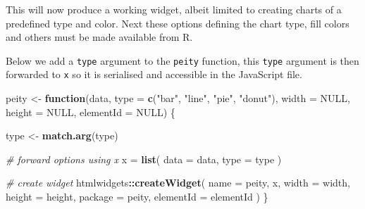 \documentclass[
]{krantz}
\makeatletter
\newenvironment{Shaded}{\begin{snugshade}}{\end{snugshade}}
\newcommand{\CommentTok}[1]{\textcolor[rgb]{0.37,0.37,0.37}{\textit{#1}}}
\newcommand{\ControlFlowTok}[1]{\textcolor[rgb]{0.27,0.27,0.27}{\textbf{#1}}}
\newcommand{\DataTypeTok}[1]{\textcolor[rgb]{0.27,0.27,0.27}{#1}}
\newcommand{\FunctionTok}[1]{\textcolor[rgb]{0,0,0}{#1}}
\newcommand{\KeywordTok}[1]{\textcolor[rgb]{0.27,0.27,0.27}{\textbf{#1}}}
\newcommand{\NormalTok}[1]{#1}
\newcommand{\OperatorTok}[1]{\textcolor[rgb]{0.43,0.43,0.43}{\textbf{#1}}}
\newcommand{\OtherTok}[1]{\textcolor[rgb]{0.37,0.37,0.37}{#1}}
\newcommand{\StringTok}[1]{\textcolor[rgb]{0.5,0.5,0.5}{#1}}
\newenvironment{kframe}{%
\medskip{}
\setlength{\fboxsep}{.8em}
 \def\at@end@of@kframe{}%
 \ifinner\ifhmode%
  \def\at@end@of@kframe{\end{minipage}}%
  \begin{minipage}{\columnwidth}%
 \fi\fi%
 \def\FrameCommand##1{\hskip\@totalleftmargin \hskip-\fboxsep
 \colorbox{shadecolor}{##1}\hskip-\fboxsep
     \hskip-\linewidth \hskip-\@totalleftmargin \hskip\columnwidth}%
 \MakeFramed {\advance\hsize-\width
   \@totalleftmargin\z@ \linewidth\hsize
   \@setminipage}}%
 {\par\unskip\endMakeFramed%
 \at@end@of@kframe}
\renewenvironment{Shaded}{\begin{kframe}}{\end{kframe}}
\makeatother
\begin{document}
\begin{Shaded}
\end{Shaded}

This will now produce a working widget, albeit limited to creating charts of a predefined type and color. Next these options defining the chart type, fill colors and others must be made available from R.

Below we add a \texttt{type} argument to the \texttt{peity} function, this \texttt{type} argument is then forwarded to \texttt{x} so it is serialised and accessible in the JavaScript file.

\begin{Shaded}
\begin{Highlighting}[]
\NormalTok{peity \textless{}{-}}\StringTok{ }\ControlFlowTok{function}\NormalTok{(data, }\DataTypeTok{type =} \KeywordTok{c}\NormalTok{(}\StringTok{"bar"}\NormalTok{, }\StringTok{"line"}\NormalTok{, }\StringTok{"pie"}\NormalTok{, }\StringTok{"donut"}\NormalTok{), }
  \DataTypeTok{width =} \OtherTok{NULL}\NormalTok{, }\DataTypeTok{height =} \OtherTok{NULL}\NormalTok{, }\DataTypeTok{elementId =} \OtherTok{NULL}\NormalTok{) \{}

\NormalTok{  type \textless{}{-}}\StringTok{ }\KeywordTok{match.arg}\NormalTok{(type)}

  \CommentTok{\# forward options using x}
\NormalTok{  x =}\StringTok{ }\KeywordTok{list}\NormalTok{(}
    \DataTypeTok{data =}\NormalTok{ data,}
    \DataTypeTok{type =}\NormalTok{ type}
\NormalTok{  )}

  \CommentTok{\# create widget}
\NormalTok{  htmlwidgets}\OperatorTok{::}\KeywordTok{createWidget}\NormalTok{(}
    \DataTypeTok{name =} \StringTok{\textquotesingle{}peity\textquotesingle{}}\NormalTok{,}
\NormalTok{    x,}
    \DataTypeTok{width =}\NormalTok{ width,}
    \DataTypeTok{height =}\NormalTok{ height,}
    \DataTypeTok{package =} \StringTok{\textquotesingle{}peity\textquotesingle{}}\NormalTok{,}
    \DataTypeTok{elementId =}\NormalTok{ elementId}
\NormalTok{  )}
\NormalTok{\}}
\end{Highlighting}
\end{Shaded}
\end{document}
